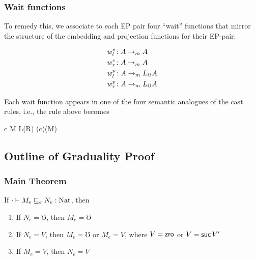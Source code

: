 \documentclass[
	11pt, %
]{beamer}
\begin{document}
\begin{frame}
	\frametitle{Wait functions}

	To remedy this, we associate to each EP pair four ``wait'' functions
	that mirror the structure of the embedding and projection functions for their EP-pair.

	\begin{align*}
		&w_l^e \colon A \to_m A \\
		&w_r^e \colon A \to_m A \\
		&w_l^p \colon A \to_m L_\mho A \\
		&w_r^p \colon A \to_m L_\mho A \\
	\end{align*}

	Each wait function appears in one of the four semantic analogues of the cast rules, i.e., the rule above becomes

	\begin{mathpar}
		{ {\proj c M} \quad L(R) \quad \wrp(c)(M) }
	\end{mathpar}

\end{frame}





\subsection{Outline of Graduality Proof}
\frame{\tableofcontents[currentsubsection]}

\begin{frame}
	\frametitle{Main Theorem}

	\begin{theorem}
		If $\cdot \vdash M_e \sqsubseteq_e N_e : \text{Nat}$, then
		\begin{enumerate}
		  \item If $N_e = \mho$, then $M_e = \mho$
		  \item If $N_e = V$, then $M_e = \mho$ or $M_e = V$, where $V = \textsf{zro}$ or $V = \textsf{suc}\, V'$
		  \item If $M_e = V$, then $N_e = V$
		\end{enumerate}
	  \end{theorem}


\end{frame}
\end{document}

